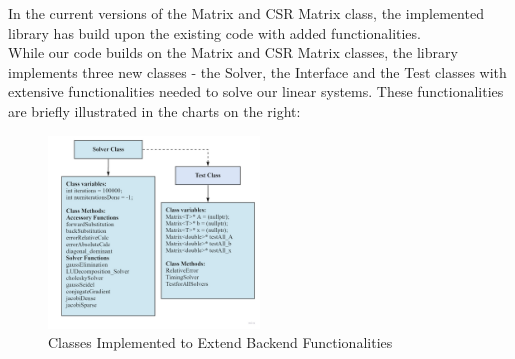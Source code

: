 \documentclass[twoside,twocolumn]{article}
\begin{document}
In the current versions of the Matrix and CSR Matrix class, the implemented library has build upon the existing code with added functionalities. \\
While our code builds on the Matrix and CSR Matrix classes, the library implements three new classes - the Solver, the Interface and the Test classes with extensive functionalities needed to solve our linear systems. These functionalities are briefly illustrated in the charts on the right:

\begin{figure}[H]
\includegraphics[width=0.5\textwidth]{images/solverandTest.jpg}
\caption{Classes Implemented to Extend Backend Functionalities}
\end{figure}
\end{document}
